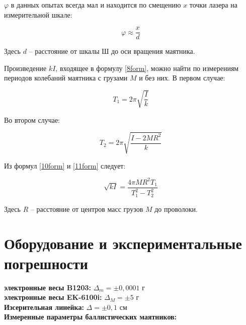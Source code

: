 \documentclass[a4paper,12pt]{article} %
\begin{document}
$\varphi$ в данных опытах всегда мал и находится по смещению $x$ точки лазера на измерительной шкале:

\begin{equation}\label{9form}
\varphi \approx \frac{x}{d}
\end{equation}

Здесь $d$ -- расстояние от шкалы $Ш$ до оси вращения маятника.

Произведение $kI$, входящее в формулу \eqref{8form}, можно найти по измерениям периодов колебаний маятника с грузами $M$ и без них. В первом случае:

\begin{equation}\label{10form}
T_1 = 2\pi \sqrt{\frac{I}{k}}
\end{equation}

Во втором случае:

\begin{equation}\label{11form}
T_2 = 2\pi \sqrt{\frac{I - 2MR^2}{k}}
\end{equation}

Из формул \eqref{10form} и \eqref{11form} следует:

\begin{equation}\label{12form}
\sqrt{kI} = \frac{4\pi MR^2 T_1}{T_1^2 - T_2^2}
\end{equation}

Здесь $R$ -- расстояние от центров масс грузов $M$ до проволоки.

\section{Оборудование и экспериментальные погрешности}

\textbf{электронные весы B1203:} $\Delta_m = \pm 0,0001$ г \\
\textbf{электронные весы EK-6100i:} $\Delta_M = \pm 5$ г \\
\textbf{Изсерительная линейка:} $\Delta = \pm 0,1$ см \\

\textbf{Измеренные параметры баллистических маятников:}
\end{document}

